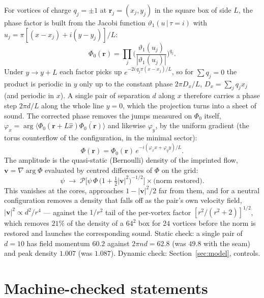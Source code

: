 \documentclass[11pt,a4paper]{article}
\begin{document}
For vortices of charge $q_j=\pm1$ at $\mathbf r_j=(x_j,y_j)$ in the square box of side $L$, the phase factor is
built from the Jacobi function $\vartheta_1(u\,|\,\tau=i)$ with $u_j=\pi[(x-x_j)+i(y-y_j)]/L$:
\begin{equation}
  \Phi_0(\mathbf r)=\prod_j\Big(\frac{\vartheta_1(u_j)}{|\vartheta_1(u_j)|}\Big)^{q_j}.
\end{equation}
Under $y\to y+L$ each factor picks up $e^{-2i\,q_j\pi(x-x_j)/L}$, so for $\sum q_j=0$ the product is periodic in $y$
only up to the constant phase $2\pi D_x/L$, $D_x=\sum_jq_jx_j$ (and periodic in $x$). A single pair of separation $d$
along $x$ therefore carries a phase step $2\pi d/L$ along the whole line $y=0$, which the projection turns into a
sheet of sound. The corrected phase removes the jumps measured on $\Phi_0$ itself,
$\varphi_x=\arg\langle\Phi_0(\mathbf r+L\hat x)\overline{\Phi_0(\mathbf r)}\rangle$ and likewise $\varphi_y$, by the
uniform gradient (the torus counterflow of the configuration, in the minimal sector):
\begin{equation}
  \Phi(\mathbf r)=\Phi_0(\mathbf r)\,e^{-i(\varphi_xx+\varphi_yy)/L}.
\end{equation}
The amplitude is the quasi-static (Bernoulli) density of the imprinted flow, $\mathbf v=\nabla\arg\Phi$ evaluated by
centred differences of $\Phi$ on the grid:
\begin{equation}
  \psi\;\to\;\mathcal P\Big[\psi\,\Phi\,\big(1+\tfrac12|\mathbf v|^2\big)^{-1/2}\Big]\times\text{(norm restored)}.
\end{equation}
This vanishes at the cores, approaches $1-|\mathbf v|^2/2$ far from them, and for a neutral configuration removes a
density that falls off as the pair's own velocity field, $|\mathbf v|^2\propto d^2/r^4$ --- against the $1/r^2$ tail of
the per-vortex factor $[r^2/(r^2+2)]^{1/2}$, which removes $21\%$ of the density of a $64^2$ box for $24$ vortices
before the norm is restored and launches the corresponding sound. Static check: a single pair of $d=10$ has field
momentum $60.2$ against $2\pi nd=62.8$ (was $49.8$ with the seam) and peak density $1.007$ (was $1.087$).
Dynamic check: Section~\ref{sec:model}, controls.

\section{Machine-checked statements}\label{app:lean}
\end{document}
